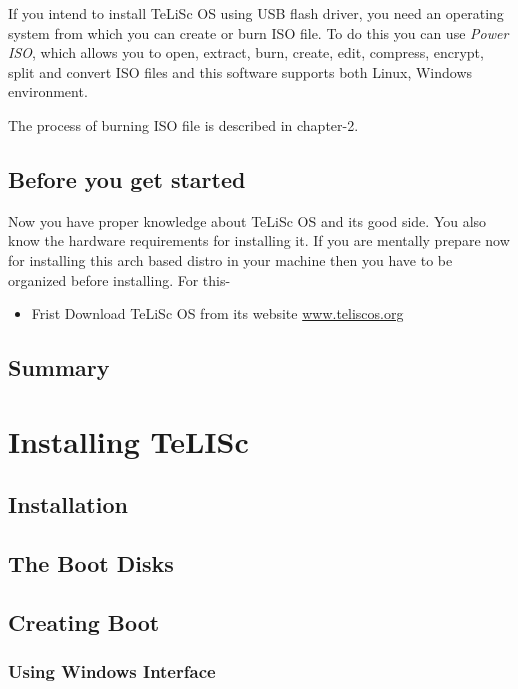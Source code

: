 \documentclass[a4paper,12pt]{book}
\begin{document}
    If you intend to install TeLiSc OS using USB flash driver, you need an operating system from which you can create or burn ISO file. To do this you can use \textit{Power ISO}, which allows you to open, extract, burn, create, edit, compress, encrypt, split and convert ISO files and this software supports both Linux, Windows environment. 
    
    The process of burning ISO file is described in chapter-2. 
    
    
    \section{Before you get started}
    
    Now you have proper knowledge about TeLiSc OS and its good side. You also know the hardware requirements for installing it. If you are mentally prepare now for installing this arch based distro in your machine then you have to be organized before installing. For this-
    
    \begin{itemize}
        \item Frist Download TeLiSc OS from its website \url{www.teliscos.org}
    \end{itemize}
    
    \section{Summary} 
    
    
    
    \chapter{Installing TeLISc}
    
    \section{Installation} 
    \section{The Boot Disks}
    
    \section{Creating Boot}
    \subsection{Using Windows Interface}
\end{document}
